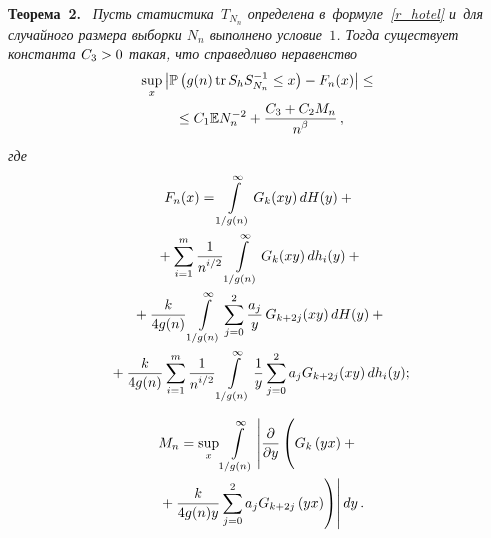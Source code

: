 \begin{multicols}{2}
\noindent
\textbf{Теорема~2.}\
%
\textit{Пусть статистика~$T_{N_n}$ определена в~формуле~\eqref{r_hotel} и~для случайного 
размера выборки $N_n$ выполнено условие~$1$. Тогда существует константа $C_3\hm>0$ 
такая, что справедливо неравенство}
\begin{multline*}
\sup\limits_{x} \left\vert \mathbb{P}\left( g(n) \,\mathrm{tr}\,S_h S^{-1}_{N_n} \leq 
x\right)  - F_{n}(x) \right\vert \leq{}\\
{}\leq C_1\mathbb{E}N_n^{-2} + \displaystyle\frac{\displaystyle C_3 + C_2 
M_n\mathstrut}{\displaystyle n^{\beta}\mathstrut}\,,
\end{multline*}
\textit{где}
\begin{multline*}
F_{n}(x) = \int\limits^{\infty}_{1/g(n)} G_k(xy)\,dH(y) + {}\\
{}+
\sum\limits_{i=1}^{m}\displaystyle\frac{\displaystyle 1\mathstrut}{\displaystyle n^{i/2}\mathstrut}\int\limits^{\infty}_{1/g(n)} G_k(xy)\,dh_i(y) 
+{} \\
{}+\displaystyle\frac{\displaystyle k\mathstrut}{\displaystyle 4 g(n)\mathstrut} \int\limits_{1/g(n)}^\infty \sum\limits_{j=0}^{2} 
\displaystyle\frac{\displaystyle a_j\mathstrut}{\displaystyle y\mathstrut}\,G_{k+2j}(xy) \,dH(y)
+{}\\
{}+ \displaystyle\frac{\displaystyle k\mathstrut}{\displaystyle 4 g(n)\mathstrut} \sum\limits_{i=1}^{m}\displaystyle\frac{\displaystyle 1\mathstrut}{\displaystyle n^{i/2}\mathstrut} \int\limits_{1/g(n)}^\infty 
\displaystyle\frac{\displaystyle 1\mathstrut}{\displaystyle y\mathstrut} \sum\limits_{j=0}^{2}a_j G_{k+2j}(xy)\,dh_i(y);
\end{multline*}

\vspace*{-12pt}

\noindent
\begin{multline*}
M_n=  \sup\limits_{x}    \int\limits_{1/g(n)}^{\infty}  \left\vert
\fr{\partial}{\partial y} 
\left( 
\vphantom{\sum\limits_{j=0}^{2}}
G_k\left(yx \right) + {}\right.\right.\\
\left.\left.{}+\fr{k}{4g(n)y}\sum\limits_{j=0}^{2}a_j G_{k+2j}\left(yx 
\right) \right)\right\vert dy\,.
\end{multline*}

 


\end{multicols}
